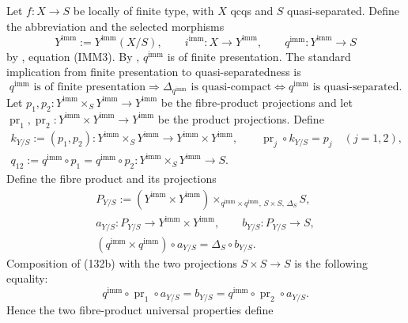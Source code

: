 \begin{definition}
  Let $f\colon X\to S$ be locally of finite type, with $X$ qcqs and $S$
  quasi-separated.  Define the abbreviation and the selected morphisms
  \[
    Y^{\mathrm{imm}}:=Y^{\mathrm{imm}}(X/S),
    \qquad
    i^{\mathrm{imm}}\colon X\to Y^{\mathrm{imm}},
    \qquad
    q^{\mathrm{imm}}\colon Y^{\mathrm{imm}}\to S                \tag{132a}
  \]
  by , equation (IMM3).  By
  , $q^{\mathrm{imm}}$ is of finite
  presentation.  The standard implication from finite presentation to
  quasi-separatedness is
  \[
    q^{\mathrm{imm}}\text{ is of finite presentation}
      \Longrightarrow
    \Delta_{q^{\mathrm{imm}}}\text{ is quasi-compact}
      \Longleftrightarrow
    q^{\mathrm{imm}}\text{ is quasi-separated}.
  \]
  Let $p_1,p_2\colon
    Y^{\mathrm{imm}}\times_SY^{\mathrm{imm}}\to Y^{\mathrm{imm}}$
  be the fibre-product projections and let
  $\operatorname{pr}_1,\operatorname{pr}_2\colon
    Y^{\mathrm{imm}}\times Y^{\mathrm{imm}}\to Y^{\mathrm{imm}}$
  be the product projections.  Define
  \[
  \begin{gathered}
    k_{Y/S}:=(p_1,p_2)\colon
      Y^{\mathrm{imm}}\times_SY^{\mathrm{imm}}\longrightarrow
      Y^{\mathrm{imm}}\times Y^{\mathrm{imm}},
    \qquad
    \operatorname{pr}_j\circ k_{Y/S}=p_j\quad(j=1,2),\\
    q_{12}:=q^{\mathrm{imm}}\circ p_1
      =q^{\mathrm{imm}}\circ p_2\colon
      Y^{\mathrm{imm}}\times_SY^{\mathrm{imm}}\to S.
  \end{gathered}
  \]
  Define the fibre product and its projections
  \[
  \begin{gathered}
    P_{Y/S}:=(Y^{\mathrm{imm}}\times Y^{\mathrm{imm}})
      \times_{q^{\mathrm{imm}}\times q^{\mathrm{imm}},\,
        S\times S,\,\Delta_S}S,\\
    a_{Y/S}\colon P_{Y/S}\to
      Y^{\mathrm{imm}}\times Y^{\mathrm{imm}},
    \qquad
    b_{Y/S}\colon P_{Y/S}\to S,\\
    (q^{\mathrm{imm}}\times q^{\mathrm{imm}})\circ a_{Y/S}
      =\Delta_S\circ b_{Y/S}.                                   
  \end{gathered} \tag{132b}
  \]
  Composition of (132b) with the two projections $S\times S\to S$ is the
  following equality:
  \[
    q^{\mathrm{imm}}\circ\operatorname{pr}_1\circ a_{Y/S}
      =b_{Y/S}
      =q^{\mathrm{imm}}\circ\operatorname{pr}_2\circ a_{Y/S}.
  \]
  Hence the two fibre-product universal properties define
  \[
  \begin{gathered}

\end{gathered}\]
\end{definition}
